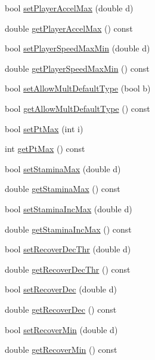 \begin{DoxyCompactItemize}
bool \hyperlink{classServerSettings_a043c97bd3a6c3e8a947cabe97631db45}{set\+Player\+Accel\+Max} (double d)
\item 
double \hyperlink{classServerSettings_ab1c0be7e5c6938b9cb14b993a3b96475}{get\+Player\+Accel\+Max} () const 
\item 
bool \hyperlink{classServerSettings_a8fe7848a2ac647e31399aa6165492d7f}{set\+Player\+Speed\+Max\+Min} (double d)
\item 
double \hyperlink{classServerSettings_ae4ef6fc9ecbc172ee962a2c194d628bd}{get\+Player\+Speed\+Max\+Min} () const 
\item 
bool \hyperlink{classServerSettings_ad8ffb5e7b8b18b8b81e24b8f3642c4ff}{set\+Allow\+Mult\+Default\+Type} (bool b)
\item 
bool \hyperlink{classServerSettings_a41fed00325a08851d7c88a28e2073384}{get\+Allow\+Mult\+Default\+Type} () const 
\item 
bool \hyperlink{classServerSettings_a00a4b9f4b20d660d5e6f14a2917fd4a1}{set\+Pt\+Max} (int i)
\item 
int \hyperlink{classServerSettings_a3af477dce65517aec3cb45e4f361885b}{get\+Pt\+Max} () const 
\item 
bool \hyperlink{classServerSettings_a8188fc5312e39dca6f26dc86899124e2}{set\+Stamina\+Max} (double d)
\item 
double \hyperlink{classServerSettings_a8f80b619e0857f510ad63433e74ec336}{get\+Stamina\+Max} () const 
\item 
bool \hyperlink{classServerSettings_ade6fd5e746605152194e12aefacf080a}{set\+Stamina\+Inc\+Max} (double d)
\item 
double \hyperlink{classServerSettings_a2d5ad986fbf61ffff3544141af1f29cd}{get\+Stamina\+Inc\+Max} () const 
\item 
bool \hyperlink{classServerSettings_a5921a4fd7ae7688b1b523b4386a13278}{set\+Recover\+Dec\+Thr} (double d)
\item 
double \hyperlink{classServerSettings_aaef5a1c835f1c88a62d6e968745cc369}{get\+Recover\+Dec\+Thr} () const 
\item 
bool \hyperlink{classServerSettings_ac179b557caeae7994e6fe1d85d9c28cf}{set\+Recover\+Dec} (double d)
\item 
double \hyperlink{classServerSettings_a0c881436c385e3f6a5303731ec2f17a8}{get\+Recover\+Dec} () const 
\item 
bool \hyperlink{classServerSettings_a8bea1fd88a7198e00831c9a2cae00251}{set\+Recover\+Min} (double d)
\item 
double \hyperlink{classServerSettings_a748a52ea5b2eaec27d8cecefbb9a9797}{get\+Recover\+Min} () const 

\end{DoxyCompactItemize}
